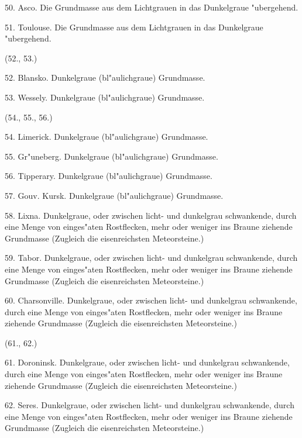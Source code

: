 \documentclass[a4paper, 11pt, oneside, polutonikogreek, german]{article}
\begin{document}
50. Asco. Die Grundmasse aus dem Lichtgrauen in das Dunkelgraue "ubergehend.

\vspace{2ex}

51. Toulouse. Die Grundmasse aus dem Lichtgrauen in das Dunkelgraue "ubergehend.

\begin{center}
(52., 53.)
\end{center}

52. Blansko. Dunkelgraue (bl"aulichgraue) Grundmasse.

53. Wessely. Dunkelgraue (bl"aulichgraue) Grundmasse.

\begin{center}
(54., 55., 56.)
\end{center}

54. Limerick. Dunkelgraue (bl"aulichgraue) Grundmasse.

55. Gr"uneberg. Dunkelgraue (bl"aulichgraue) Grundmasse.

56. Tipperary. Dunkelgraue (bl"aulichgraue) Grundmasse.

\vspace{2ex}

57. Gouv. Kursk. Dunkelgraue (bl"aulichgraue) Grundmasse.

58. Lixna. Dunkelgraue, oder zwischen licht- und dunkelgrau schwankende, durch eine Menge von einges"aten Rostflecken, mehr oder weniger ins Braune ziehende Grundmasse (Zugleich die eisenreichsten Meteorsteine.)

59. Tabor. Dunkelgraue, oder zwischen licht- und dunkelgrau schwankende, durch eine Menge von einges"aten Rostflecken, mehr oder weniger ins Braune ziehende Grundmasse (Zugleich die eisenreichsten Meteorsteine.)

60. Charsonville. Dunkelgraue, oder zwischen licht- und dunkelgrau schwankende, durch eine Menge von einges"aten Rostflecken, mehr oder weniger ins Braune ziehende Grundmasse (Zugleich die eisenreichsten Meteorsteine.)

\begin{center}
(61., 62.)
\end{center}

61. Doroninsk. Dunkelgraue, oder zwischen licht- und dunkelgrau schwankende, durch eine Menge von einges"aten Rostflecken, mehr oder weniger ins Braune ziehende Grundmasse (Zugleich die eisenreichsten Meteorsteine.)

62. Seres. Dunkelgraue, oder zwischen licht- und dunkelgrau schwankende, durch eine Menge von einges"aten Rostflecken, mehr oder weniger ins Braune ziehende Grundmasse (Zugleich die eisenreichsten Meteorsteine.)
\end{document}
